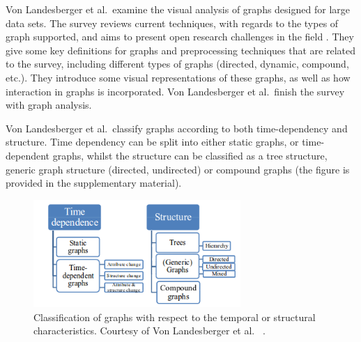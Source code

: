Von Landesberger et al.\ examine the visual analysis of graphs designed for large data sets. The survey reviews current techniques, with regards to the types of graph supported, and aims to present open research challenges in the field \cite{von2011visual}.
They give some key definitions for graphs and preprocessing techniques that are related to the survey, including different types of graphs (directed, dynamic, compound, etc.). They introduce some visual representations of these graphs, as well as how interaction in graphs is incorporated. Von Landesberger et al.\ finish the survey with graph analysis.

Von Landesberger et al.\ classify graphs according to both time-dependency and structure. Time dependency can be split into either static graphs, or time-dependent graphs, whilst the structure can be classified as a tree structure, generic graph structure (directed, undirected) or compound graphs (the figure is provided in the supplementary material).

\begin{figure}[t]
\begin{center}
\includegraphics[width=0.7\textwidth]{images/von2011visual}
\caption{Classification of graphs with respect to the temporal or structural characteristics. Courtesy of Von Landesberger et al.\ \cite{von2011visual} .} \label{fig: von2011visual}
\end{center}
\end{figure}

